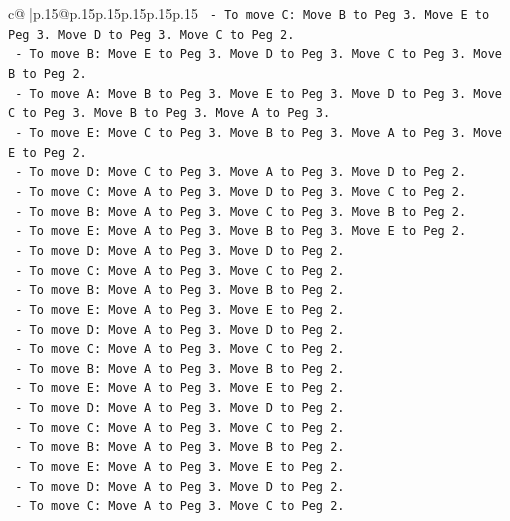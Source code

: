 \documentclass{article}
\begin{document}
{\begin{supertabular}{c@{$\;$}|p{.15\linewidth}@{}p{.15\linewidth}p{.15\linewidth}p{.15\linewidth}p{.15\linewidth}p{.15\linewidth}}
{{{\texttt{        {-}   To move C: Move B to Peg 3. Move E to Peg 3. Move D to Peg 3. Move C to Peg 2.} \\
\texttt{        {-}   To move B: Move E to Peg 3. Move D to Peg 3. Move C to Peg 3. Move B to Peg 2.} \\
\texttt{        {-}   To move A: Move B to Peg 3. Move E to Peg 3. Move D to Peg 3. Move C to Peg 3. Move B to Peg 3. Move A to Peg 3.} \\
\texttt{        {-}   To move E: Move C to Peg 3. Move B to Peg 3. Move A to Peg 3. Move E to Peg 2.} \\
\texttt{        {-}   To move D: Move C to Peg 3. Move A to Peg 3. Move D to Peg 2.} \\
\texttt{        {-}   To move C: Move A to Peg 3. Move D to Peg 3. Move C to Peg 2.} \\
\texttt{        {-}   To move B: Move A to Peg 3. Move C to Peg 3. Move B to Peg 2.} \\
\texttt{        {-}   To move E: Move A to Peg 3. Move B to Peg 3. Move E to Peg 2.} \\
\texttt{        {-}   To move D: Move A to Peg 3. Move D to Peg 2.} \\
\texttt{        {-}   To move C: Move A to Peg 3. Move C to Peg 2.} \\
\texttt{        {-}   To move B: Move A to Peg 3. Move B to Peg 2.} \\
\texttt{        {-}   To move E: Move A to Peg 3. Move E to Peg 2.} \\
\texttt{        {-}   To move D: Move A to Peg 3. Move D to Peg 2.} \\
\texttt{        {-}   To move C: Move A to Peg 3. Move C to Peg 2.} \\
\texttt{        {-}   To move B: Move A to Peg 3. Move B to Peg 2.} \\
\texttt{        {-}   To move E: Move A to Peg 3. Move E to Peg 2.} \\
\texttt{        {-}   To move D: Move A to Peg 3. Move D to Peg 2.} \\
\texttt{        {-}   To move C: Move A to Peg 3. Move C to Peg 2.} \\
\texttt{        {-}   To move B: Move A to Peg 3. Move B to Peg 2.} \\
\texttt{        {-}   To move E: Move A to Peg 3. Move E to Peg 2.} \\
\texttt{        {-}   To move D: Move A to Peg 3. Move D to Peg 2.} \\
\texttt{        {-}   To move C: Move A to Peg 3. Move C to Peg 2.} \\
}}}
\end{supertabular}}
\end{document}
